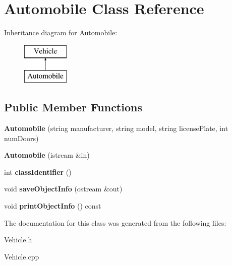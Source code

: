 \hypertarget{class_automobile}{}\section{Automobile Class Reference}
\label{class_automobile}
Inheritance diagram for Automobile\+:\begin{figure}[H]
\begin{center}
\leavevmode
\includegraphics[height=2.000000cm]{class_automobile}
\end{center}
\end{figure}
\subsection*{Public Member Functions}
\begin{DoxyCompactItemize}
\item 
\hypertarget{class_automobile_a50de91a49a5e647f4fddc81448bbd764}{}{\bfseries Automobile} (string manufacturer, string model, string license\+Plate, int num\+Doors)\label{class_automobile_a50de91a49a5e647f4fddc81448bbd764}

\item 
\hypertarget{class_automobile_a2b19291f5f88159eebd8432cb648ec78}{}{\bfseries Automobile} (istream \&in)\label{class_automobile_a2b19291f5f88159eebd8432cb648ec78}

\item 
\hypertarget{class_automobile_a77ef785be9cd16cef586c7caaf44ae6a}{}int {\bfseries class\+Identifier} ()\label{class_automobile_a77ef785be9cd16cef586c7caaf44ae6a}

\item 
\hypertarget{class_automobile_a57f35aee6f148238bd958bd7e348700f}{}void {\bfseries save\+Object\+Info} (ostream \&out)\label{class_automobile_a57f35aee6f148238bd958bd7e348700f}

\item 
\hypertarget{class_automobile_adf6a4503cb73f9d8a0fb588c2c472540}{}void {\bfseries print\+Object\+Info} () const \label{class_automobile_adf6a4503cb73f9d8a0fb588c2c472540}

\end{DoxyCompactItemize}


The documentation for this class was generated from the following files\+:\begin{DoxyCompactItemize}
\item 
Vehicle.\+h\item 
Vehicle.\+cpp\end{DoxyCompactItemize}
